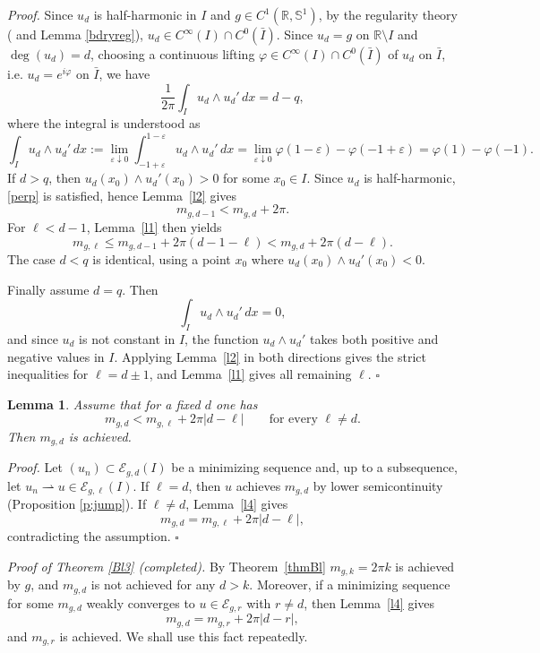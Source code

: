 \documentclass[12pt, a4paper]{article}
\newtheorem{lem}[thm]{Lemma}
\newenvironment{proof}{\noindent\emph{Proof.}}{\hfill$\square$\medskip}
\newcommand{\M}[1]{\mathcal{#1}}
\newcommand{\sph}{\mathbb{S}}
\newcommand{\R}{\mathbb{R}}
\newcommand{\ve}{\varepsilon}
\renewcommand{\(}{\left(}
\renewcommand{\)}{\right)}
\begin{document}
\begin{proof}
Since $u_d$ is half-harmonic in $I$ and $g\in C^1(\R,\sph^1)$, by the regularity theory (\cite{DLR,Sch} and Lemma \ref{bdryreg}), $u_d\in C^\infty(I)\cap C^0(\bar I)$. Since $u_d=g$ on $\R\setminus I$ and $\deg(u_d)=d$, choosing a continuous lifting $\varphi\in C^\infty(I)\cap C^0(\bar I)$ of $u_d$ on $\bar I$, i.e. $u_d=e^{i\varphi}$ on $\bar I$, we have
\[
\frac1{2\pi}\int_I u_d\wedge u_d'\,dx=d-q,
\]
where the integral is understood as
\[
\int_I u_d\wedge u_d'\,dx
:=\lim_{\varepsilon\downarrow0}
\int_{-1+\varepsilon}^{1-\varepsilon} u_d\wedge u_d'\,dx
=\lim_{\ve\downarrow 0}\varphi(1-\ve)-\varphi(-1+\ve)= \varphi(1)-\varphi(-1).
\]
If $d>q$, then $u_d(x_0)\wedge u_d'(x_0)>0$ for some $x_0\in I$. Since $u_d$ is half-harmonic, \eqref{perp} is satisfied, hence Lemma~\ref{l2} gives
\[
m_{g,d-1}<m_{g,d}+2\pi .
\]
For $\ell<d-1$, Lemma~\ref{l1} then yields
\[
m_{g,\ell}\le m_{g,d-1}+2\pi(d-1-\ell)
          < m_{g,d}+2\pi(d-\ell).
\]
The case $d<q$ is identical, using a point $x_0$ where $u_d(x_0)\wedge u_d'(x_0)<0$.

Finally assume $d=q$. Then
\[
\int_I u_d\wedge u_d'\,dx=0,
\]
and since $u_d$ is not constant in $I$, the function $u_d\wedge u_d'$ takes both positive and negative values in $I$. Applying Lemma~\ref{l2} in both directions gives the strict inequalities for $\ell=d\pm1$, and Lemma~\ref{l1} gives all remaining $\ell$.
\end{proof}


\begin{lem}\label{lem:attainment-criterion}
Assume that for a fixed $d$ one has
\[
m_{g,d}<m_{g,\ell}+2\pi|d-\ell|
\qquad\text{for every }\ell\neq d.
\]
Then $m_{g,d}$ is achieved.
\end{lem}

\begin{proof}
Let $(u_n)\subset\M E_{g,d}(I)$ be a minimizing sequence and, up to a subsequence, let
$u_n\rightharpoonup u\in \M E_{g,\ell}(I)$. If $\ell=d$, then $u$ achieves $m_{g,d}$ by lower semicontinuity (Proposition \ref{p:jump}). If $\ell\neq d$, Lemma~\ref{l4} gives
\[
m_{g,d}=m_{g,\ell}+2\pi|d-\ell|,
\]
contradicting the assumption.
\end{proof}



\noindent\emph{Proof of Theorem \ref{Bl3} (completed).}
By Theorem~\ref{thmBl} $m_{g,k}=2\pi k$ is achieved by $g$, and $m_{g,d}$ is not achieved for any $d>k$. Moreover, if a minimizing sequence for some $m_{g,d}$ weakly converges to $u\in \mathcal{E}_{g,r}$ with $r\neq d$, then Lemma~\ref{l4} gives
\[
 m_{g,d}=m_{g,r}+2\pi |d-r|,
\]
and $m_{g,r}$ is achieved. We shall use this fact repeatedly.
\end{document}
